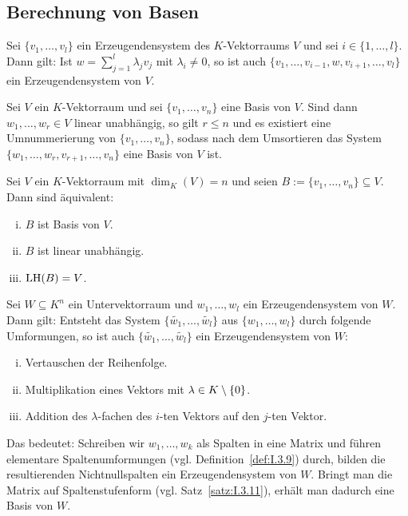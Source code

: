 \subsection{Berechnung von Basen}

\begin{lemma}[Austauschlemma]
	\label{lemma:I.9.1}
	Sei $\{v_1,\dots,v_l\}$ ein Erzeugendensystem des $K$-Vektorraums $V$ und sei $i \in \{1,\dots,l\}$.
	Dann gilt:
	Ist $w = \sum_{j=1}^{l} \lambda_j v_j$ mit $\lambda_i \neq 0$, so ist auch $\{v_1,\dots,v_{i-1},w,v_{i+1},\dots,v_l\}$ ein Erzeugendensystem von $V$.
\end{lemma}

\begin{satz}[Basisergänzungssatz]
	\label{satz:I.9.2}
	Sei $V$ ein $K$-Vektorraum und sei $\{v_1,\dots,v_n\}$ eine Basis von $V$.
	Sind dann $w_1,\dots,w_r \in V$ linear unabhängig, so gilt $r \leq n$ und es existiert eine Umnummerierung von $\{v_1,\dots,v_n\}$, sodass nach dem Umsortieren das System $\{w_1,\dots,w_r,v_{r+1},\dots,v_n\}$ eine Basis von $V$ ist.
\end{satz}

\begin{satz}
	\label{satz:I.9.3}
	Sei $V$ ein $K$-Vektorraum mit $\dim_K(V) = n$ und seien $B := \{v_1,\dots,v_n\} \subseteq V$.
	Dann sind äquivalent:
	\begin{enumerate}[(i)]
		\item $B$ ist Basis von $V$.
		\item $B$ ist linear unabhängig.
		\item $\operatorname{LH}(B) = V$.
	\end{enumerate}
\end{satz}

\begin{satz}
	\label{satz:I.9.4}
	Sei $W \subseteq K^n$ ein Untervektorraum und $w_1,\dots,w_l$ ein Erzeugendensystem von $W$.
	Dann gilt:
	Entsteht das System $\{\widetilde{w_1},\dots,\widetilde{w_l}\}$ aus $\{w_1,\dots,w_l\}$ durch folgende Umformungen, so ist auch $\{\widetilde{w_1},\dots,\widetilde{w_l}\}$ ein Erzeugendensystem von $W$:
	\begin{enumerate}[(i)]
		\item Vertauschen der Reihenfolge.
		\item Multiplikation eines Vektors mit $\lambda \in K \setminus \{0\}$.
		\item Addition des $\lambda$-fachen des $i$-ten Vektors auf den $j$-ten Vektor.
	\end{enumerate}
	Das bedeutet:
	Schreiben wir $w_1,\dots,w_k$ als Spalten in eine Matrix und führen elementare Spaltenumformungen (vgl. Definition~\ref{def:I.3.9}) durch, bilden die resultierenden Nichtnullspalten ein Erzeugendensystem von $W$.
	Bringt man die Matrix auf Spaltenstufenform (vgl. Satz~\ref{satz:I.3.11}), erhält man dadurch eine Basis von $W$.
\end{satz}

